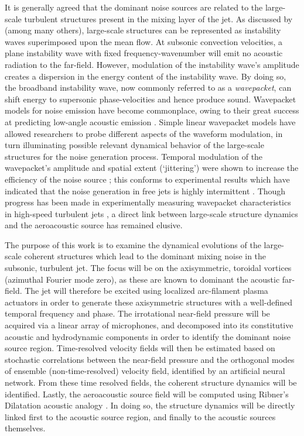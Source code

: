 It is generally agreed that the dominant noise sources are related to the large-scale turbulent structures present in the mixing layer of the jet. 
As discussed by \citet{Tam1995} (among many others), large-scale structures can be represented as instability waves superimposed upon the mean flow.
At subsonic convection velocities, a plane instability wave with fixed frequency-wavenumber will emit no acoustic radiation to the far-field.
However, modulation of the instability wave's amplitude creates a dispersion in the energy content of the instability wave.
By doing so, the broadband instability wave, now commonly referred to as a \emph{wavepacket}, can shift energy to supersonic phase-velocities and hence produce sound.
Wavepacket models for noise emission have become commonplace, owing to their great success at predicting low-angle acoustic emission \citep{Obrist2011}.
Simple linear wavepacket models have allowed researchers to probe different aspects of the waveform modulation, in turn illuminating possible relevant dynamical behavior of the large-scale structures for the noise generation process.
Temporal modulation of the wavepacket's amplitude and spatial extent (`jittering') were shown to increase the efficiency of the noise source \citep{Cavalieri2010}; this conforms to experimental results which have indicated that the noise generation in free jets is highly intermittent \citep{Hileman2005,Kearney-Fischer2013}. 
Though progress has been made in experimentally measuring wavepacket characteristics in high-speed turbulent jets \citep{Cavalieri2013,Baqui2014}, a direct link between large-scale structure dynamics and the aeroacoustic source has remained elusive.

The purpose of this work is to examine the dynamical evolutions of the large-scale coherent structures which lead to the dominant mixing noise in the subsonic, turbulent jet.
The focus will be on the axisymmetric, toroidal vortices (azimuthal Fourier mode zero), as these are known to dominant the acoustic far-field.
The jet will therefore be excited using localized arc-filament plasma actuators in order to generate these axisymmetric structures with a well-defined temporal frequency and phase.
The irrotational near-field pressure will be acquired via a linear array of microphones, and decomposed into its constitutive acoustic and hydrodynamic components in order to identify the dominant noise source region.
Time-resolved velocity fields will then be estimated based on stochastic correlations between the near-field pressure and the orthogonal modes of ensemble (non-time-resolved) velocity field, identified by an artificial neural network.
From these time resolved fields, the coherent structure dynamics will be identified.
Lastly, the aeroacoustic source field will be computed using Ribner's Dilatation acoustic analogy \citep{Ribner1962}.
In doing so, the structure dynamics will be directly linked first to the acoustic source region, and finally to the acoustic sources themselves.
	
